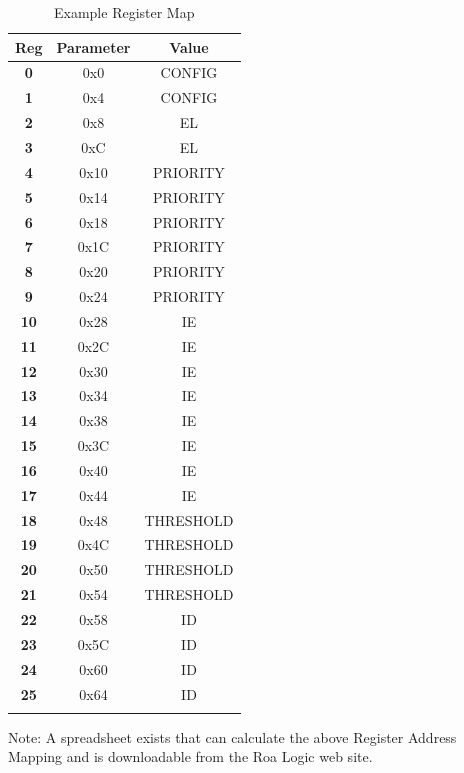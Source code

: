 \begin{longtable}[c]{ccc}	
		\toprule 
		\textbf{Reg} & \textbf{Parameter} & \textbf{Value}\\
		\midrule 
		\endhead
		\textbf{0} & 0x0 & CONFIG\\
		\textbf{1} & 0x4 & CONFIG\\
		\textbf{2} & 0x8 & EL\\
		\textbf{3} & 0xC & EL\\
		\textbf{4} & 0x10 & PRIORITY\\
		\textbf{5} & 0x14 & PRIORITY\\
		\textbf{6} & 0x18 & PRIORITY\\
		\textbf{7} & 0x1C & PRIORITY\\
		\textbf{8} & 0x20 & PRIORITY\\
		\textbf{9} & 0x24 & PRIORITY\\
		\textbf{10} & 0x28 & IE\\
		\textbf{11} & 0x2C & IE\\
		\textbf{12} & 0x30 & IE\\
		\textbf{13} & 0x34 & IE\\
		\textbf{14} & 0x38 & IE\\
		\textbf{15} & 0x3C & IE\\
		\textbf{16} & 0x40 & IE\\
		\textbf{17} & 0x44 & IE\\
		\textbf{18} & 0x48 & THRESHOLD\\
		\textbf{19} & 0x4C & THRESHOLD\\
		\textbf{20} & 0x50 & THRESHOLD\\
		\textbf{21} & 0x54 & THRESHOLD\\
		\textbf{22} & 0x58 & ID\\
		\textbf{23} & 0x5C & ID\\
		\textbf{24} & 0x60 & ID\\
		\textbf{25} & 0x64 & ID\\
		\bottomrule 	
	\caption{Example Register Map}
	\label{tab:REGMAPRES}
\end{longtable}

Note: A spreadsheet exists that can calculate the above Register Address
Mapping and is downloadable from the Roa Logic web site.

